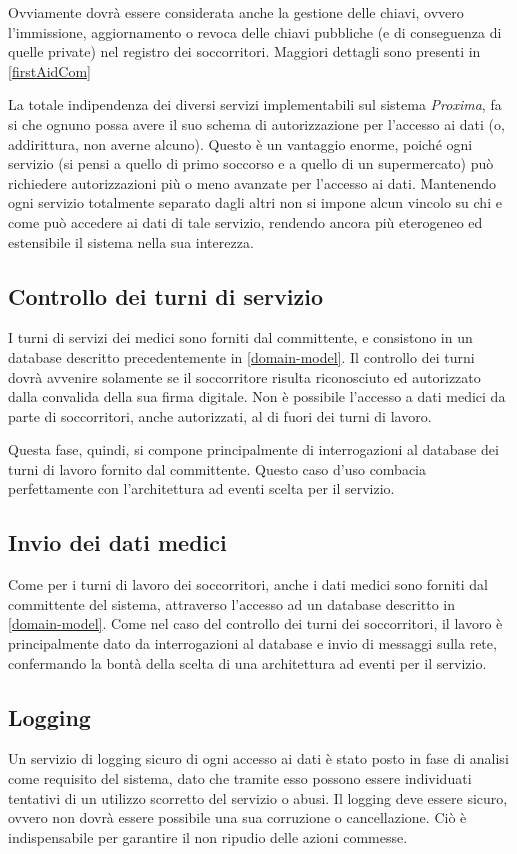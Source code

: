 \documentclass[a4paper,12pt]{report}
\begin{document}
Ovviamente dovrà essere considerata anche la gestione delle chiavi, ovvero l'immissione, aggiornamento o revoca delle chiavi pubbliche (e di conseguenza di quelle private) nel registro dei soccorritori. Maggiori dettagli sono presenti in \autoref{firstAidCom}

La totale indipendenza dei diversi servizi implementabili sul sistema \emph{Proxima}, fa si che ognuno possa avere il suo schema di autorizzazione per l'accesso ai dati (o, addirittura, non averne alcuno). Questo è un vantaggio enorme, poiché ogni servizio (si pensi a quello di primo soccorso e a quello di un supermercato) può richiedere autorizzazioni più o meno avanzate per l'accesso ai dati. Mantenendo ogni servizio totalmente separato dagli altri non si impone alcun vincolo su chi e come può accedere ai dati di tale servizio, rendendo ancora più eterogeneo ed estensibile il sistema nella sua interezza.

\subsection{Controllo dei turni di servizio}
I turni di servizi dei medici sono forniti dal committente, e consistono in un database descritto precedentemente in \autoref{domain-model}. Il controllo dei turni dovrà avvenire solamente se il soccorritore risulta riconosciuto ed autorizzato dalla convalida della sua firma digitale. Non è possibile l'accesso a dati medici da parte di soccorritori, anche autorizzati, al di fuori dei turni di lavoro. 

Questa fase, quindi, si compone principalmente di interrogazioni al database dei turni di lavoro fornito dal committente. Questo caso d'uso combacia perfettamente con l'architettura ad eventi scelta per il servizio. 
\subsection{Invio dei dati medici}
Come per i turni di lavoro dei soccorritori, anche i dati medici sono forniti dal committente del sistema, attraverso l'accesso ad un database descritto in \autoref{domain-model}. Come nel caso del controllo dei turni dei soccorritori, il lavoro è principalmente dato da interrogazioni al database e invio di messaggi sulla rete, confermando la bontà della scelta di una architettura ad eventi per il servizio. 
\subsection{Logging}
Un servizio di logging sicuro di ogni accesso ai dati è stato posto in fase di analisi come requisito del sistema, dato che tramite esso possono essere individuati tentativi di un utilizzo scorretto del servizio o abusi. Il logging deve essere sicuro, ovvero non dovrà essere possibile una sua corruzione o cancellazione. Ciò è indispensabile per garantire il non ripudio delle azioni commesse. 
\end{document}
